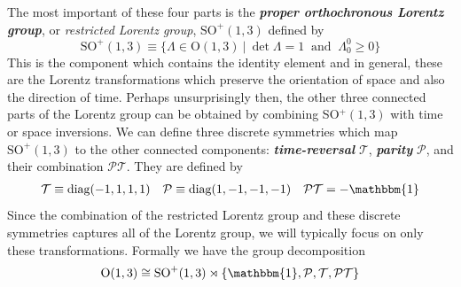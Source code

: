 \documentclass[onecolumn]{gwclass}
\renewcommand{\t}[1]{\text{#1}}
\begin{document}
The most important of these four parts is the \textbf{\emph{proper orthochronous Lorentz group}}, or \emph{restricted Lorentz group}, $\t{SO}^+(1,3)$ defined by
$$ \t{SO}^+(1,3) \equiv \{ \Lambda \in \t{O}(1,3) \:|\: \det\Lambda=1 \:\t{ and }\:\Lambda^0_0 \geq 0 \} $$
This is the component which contains the identity element and in general, these are the Lorentz transformations which preserve the orientation of space and also the direction of time. Perhaps unsurprisingly then, the other three connected parts of the Lorentz group can be obtained by combining SO$^+(1,3)$ with time or space inversions. We can define three discrete symmetries which map $\t{SO}^+(1,3)$ to the other connected components: \textbf{\emph{time-reversal}} $\mathcal{T}$, \textbf{\emph{parity}} $\mathcal{P}$, and their combination $\mathcal{PT}$. They are defined by
\begin{align*}
	\mathcal{T} \equiv \t{diag}(-1,1,1,1) && \mathcal{P}\equiv \t{diag}(1, -1, -1, -1) && \mathcal{PT}= - \mathbbm{1}
\end{align*}
Since the combination of the restricted Lorentz group and these discrete symmetries captures all of the Lorentz group, we will typically focus on only these transformations. Formally we have the group decomposition
$$ \t{O}(1,3) \cong \t{SO}^+(1,3) \rtimes \{\mathbbm{1}, \mathcal{P}, \mathcal{T}, \mathcal{PT}\} $$
\end{document}
